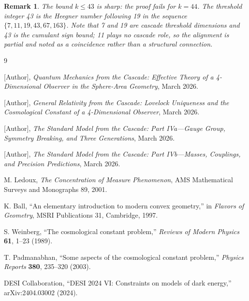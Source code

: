 \documentclass[11pt,a4paper]{article}
\newtheorem{remark}[theorem]{Remark}
\begin{document}
\begin{remark}
The bound $k\leq 43$ is sharp: the proof fails for $k=44$. The threshold integer 43 is the Heegner number following 19 in the sequence $\{7, 11, 19, 43, 67, 163\}$. Note that 7 and 19 are cascade threshold dimensions and 43 is the cumulant sign bound; 11 plays no cascade role, so the alignment is partial and noted as a coincidence rather than a structural connection.
\end{remark}

\begin{thebibliography}{9}

 [Author], \textit{Quantum Mechanics from the Cascade: Effective Theory of a 4-Dimensional Observer in the Sphere-Area Geometry}, March 2026.

 [Author], \textit{General Relativity from the Cascade: Lovelock Uniqueness and the Cosmological Constant of a 4-Dimensional Observer}, March 2026.

 [Author], \textit{The Standard Model from the Cascade: Part IVa---Gauge Group, Symmetry Breaking, and Three Generations}, March 2026.

 [Author], \textit{The Standard Model from the Cascade: Part IVb---Masses, Couplings, and Precision Predictions}, March 2026.

 M. Ledoux, \textit{The Concentration of Measure Phenomenon}, AMS Mathematical Surveys and Monographs 89, 2001.

 K. Ball, ``An elementary introduction to modern convex geometry,'' in \textit{Flavors of Geometry}, MSRI Publications 31, Cambridge, 1997.

 S. Weinberg, ``The cosmological constant problem,'' \textit{Reviews of Modern Physics} \textbf{61}, 1--23 (1989).

 T. Padmanabhan, ``Some aspects of the cosmological constant problem,'' \textit{Physics Reports} \textbf{380}, 235--320 (2003).

 DESI Collaboration, ``DESI 2024 VI: Constraints on models of dark energy,'' arXiv:2404.03002 (2024).

\end{thebibliography}
\end{document}
